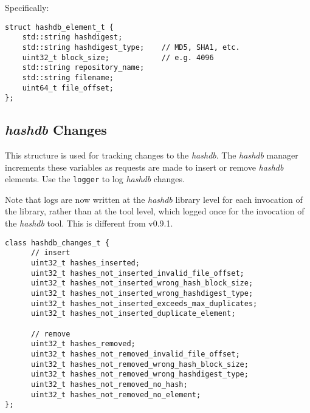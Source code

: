 \documentclass[12pt,twoside]{article}
\newcommand{\hdb}{\emph{hashdb}\xspace}
\begin{document}
Specifically:
\begin{small}
\begin{verbatim}
struct hashdb_element_t {
    std::string hashdigest;
    std::string hashdigest_type;    // MD5, SHA1, etc.
    uint32_t block_size;            // e.g. 4096
    std::string repository_name;
    std::string filename;
    uint64_t file_offset;
};
\end{verbatim}
\end{small}

\subsection{\hdb Changes}
This structure is used for tracking changes to the \hdb.
The \hdb manager increments these variables
as requests are made to insert or remove \hdb elements.
Use the \texttt{logger} to log \hdb changes.

Note that logs are now written at the \hdb library level
for each invocation of the library,
rather than at the tool level, which logged once
for the invocation of the \hdb tool.
This is different from v0.9.1.

\begin{small}
\begin{verbatim}
class hashdb_changes_t {
      // insert
      uint32_t hashes_inserted;
      uint32_t hashes_not_inserted_invalid_file_offset;
      uint32_t hashes_not_inserted_wrong_hash_block_size;
      uint32_t hashes_not_inserted_wrong_hashdigest_type;
      uint32_t hashes_not_inserted_exceeds_max_duplicates;
      uint32_t hashes_not_inserted_duplicate_element;

      // remove
      uint32_t hashes_removed;
      uint32_t hashes_not_removed_invalid_file_offset;
      uint32_t hashes_not_removed_wrong_hash_block_size;
      uint32_t hashes_not_removed_wrong_hashdigest_type;
      uint32_t hashes_not_removed_no_hash;
      uint32_t hashes_not_removed_no_element;
};
\end{verbatim}
\end{small}

\end{document}
